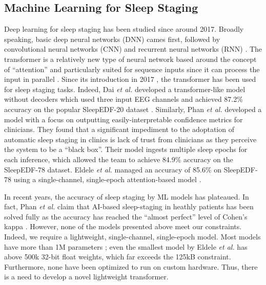 \subsection{Machine Learning for Sleep Staging}
Deep learning for sleep staging has been studied since around 2017. Broadly speaking, basic deep neural networks (DNN) cames first, followed by convolutional neural networks (CNN)
and recurrent neural networks (RNN) \cite{phan2022sleeptransformer}. The transformer is a relatively new type of neural network based around the concept of ``attention'' and particularly
suited for sequence inputs since it can process the input in parallel \cite{han2022survey}. Since its introduction in 2017 \cite{vaswani2017attention}, the transformer has been used for
sleep staging tasks. Indeed, Dai \textit{et al.} developed a transformer-like model without decoders which used three input EEG channels and achieved 87.2\% accuracy on the popular SleepEDF-20
dataset \cite{dai2023multichannelsleepnet}. Similarly, Phan \textit{et al.} developed a model with a focus on outputting easily-interpretable confidence metrics for clinicians. They found
that a significant impediment to the adoptation of automatic sleep staging in clinics is lack of trust from clinicians as they perceive the system to be a ``black box''. Their model
ingests multiple sleep epochs for each inference, which allowed the team to achieve 84.9\% accuracy on the SleepEDF-78 dataset. Eldele \textit{et al.} managed an accuracy of 85.6\% on
SleepEDF-78 using a single-channel, single-epoch attention-based model \cite{eldele2021attention}.

In recent years, the accuracy of sleep staging by ML models has plateaued. In fact, Phan \textit{et al.} claim that AI-based sleep-staging in heathly patients has been solved fully as the
accuracy has reached the ``almost perfect'' level of Cohen's kappa \cite{phan2022automatic}. However, none of the models presented above meet our constraints. Indeed, we require a lightweight,
single-channel, single-epoch model. Most models have more than 1M parameters \cite{phan2022sleeptransformer}; even the smallest model by Eldele \textit{et al.} has above 500k 32-bit float
weights, which far exceeds the 125kB constraint. Furthermore, none have been optimized to run on custom hardware. Thus, there is a need to develop a novel lightweight transformer.

